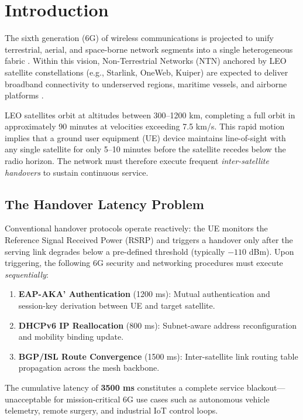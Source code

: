 \documentclass[conference]{IEEEtran}
\begin{document}
\section{Introduction}

The sixth generation (6G) of wireless communications is projected to unify terrestrial, aerial, and space-borne network segments into a single heterogeneous fabric \cite{b1}. Within this vision, Non-Terrestrial Networks (NTN) anchored by LEO satellite constellations (e.g., Starlink, OneWeb, Kuiper) are expected to deliver broadband connectivity to underserved regions, maritime vessels, and airborne platforms \cite{b2}.

LEO satellites orbit at altitudes between 300--1200 km, completing a full orbit in approximately 90 minutes at velocities exceeding 7.5 km/s. This rapid motion implies that a ground user equipment (UE) device maintains line-of-sight with any single satellite for only 5--10 minutes before the satellite recedes below the radio horizon. The network must therefore execute frequent \textit{inter-satellite handovers} to sustain continuous service.

\subsection{The Handover Latency Problem}

Conventional handover protocols operate reactively: the UE monitors the Reference Signal Received Power (RSRP) and triggers a handover only after the serving link degrades below a pre-defined threshold (typically $-110$ dBm). Upon triggering, the following 6G security and networking procedures must execute \textit{sequentially}:

\begin{enumerate}
    \item \textbf{EAP-AKA' Authentication} (1200 ms): Mutual authentication and session-key derivation between UE and target satellite.
    \item \textbf{DHCPv6 IP Reallocation} (800 ms): Subnet-aware address reconfiguration and mobility binding update.
    \item \textbf{BGP/ISL Route Convergence} (1500 ms): Inter-satellite link routing table propagation across the mesh backbone.
\end{enumerate}

The cumulative latency of \textbf{3500 ms} constitutes a complete service blackout---unacceptable for mission-critical 6G use cases such as autonomous vehicle telemetry, remote surgery, and industrial IoT control loops.
\end{document}
